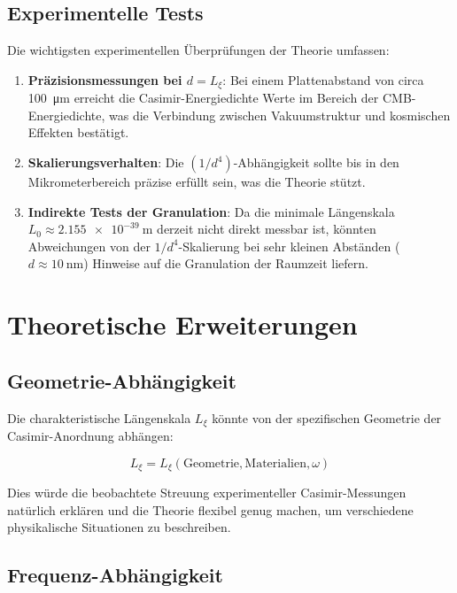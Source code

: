 \documentclass[12pt,a4paper]{article}
\begin{document}
	\subsection{Experimentelle Tests}
	
	Die wichtigsten experimentellen Überprüfungen der Theorie umfassen:
	
	\begin{enumerate}
		\item \textbf{Präzisionsmessungen bei \( d = L_\xi \)}: Bei einem Plattenabstand von circa \SI{100}{\micro\meter} erreicht die Casimir-Energiedichte Werte im Bereich der CMB-Energiedichte, was die Verbindung zwischen Vakuumstruktur und kosmischen Effekten bestätigt.
		\item \textbf{Skalierungsverhalten}: Die \( (1/d^4) \)-Abhängigkeit sollte bis in den Mikrometerbereich präzise erfüllt sein, was die Theorie stützt.
		\item \textbf{Indirekte Tests der Granulation}: Da die minimale Längenskala \( L_0 \approx \SI{2.155e-39}{\meter} \) derzeit nicht direkt messbar ist, könnten Abweichungen von der \( 1/d^4 \)-Skalierung bei sehr kleinen Abständen (\( d \approx \SI{10}{\nano\meter} \)) Hinweise auf die Granulation der Raumzeit liefern.
	\end{enumerate}
	
	\section{Theoretische Erweiterungen}
	
	\subsection{Geometrie-Abhängigkeit}
	
	Die charakteristische Längenskala \( L_\xi \) könnte von der spezifischen Geometrie der Casimir-Anordnung abhängen:
	
	\begin{equation}
		L_\xi = L_\xi(\text{Geometrie}, \text{Materialien}, \omega) \label{eq:Lxi_dependencies}
	\end{equation}
	
	Dies würde die beobachtete Streuung experimenteller Casimir-Messungen natürlich erklären und die Theorie flexibel genug machen, um verschiedene physikalische Situationen zu beschreiben.
	
	\subsection{Frequenz-Abhängigkeit}
	
\end{document}
